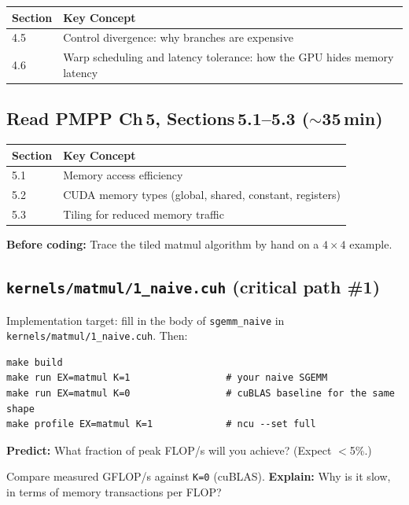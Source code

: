 \documentclass[11pt, letterpaper]{article}
\begin{document}
\begin{tabularx}{\textwidth}{@{}lX@{}}
\toprule
\textbf{Section} & \textbf{Key Concept} \\
\midrule
4.5 & Control divergence: why branches are expensive \\
4.6 & Warp scheduling and latency tolerance: how the GPU hides memory latency \\
\bottomrule
\end{tabularx}

\subsection{Read PMPP Ch\,5, Sections\,5.1--5.3 ($\sim$35\,min)}

\begin{tabularx}{\textwidth}{@{}lX@{}}
\toprule
\textbf{Section} & \textbf{Key Concept} \\
\midrule
5.1 & Memory access efficiency \\
5.2 & CUDA memory types (global, shared, constant, registers) \\
5.3 & Tiling for reduced memory traffic \\
\bottomrule
\end{tabularx}

\textbf{Before coding:} Trace the tiled matmul algorithm by hand on a $4 \times 4$ example.

\subsection{\texttt{kernels/matmul/1\_naive.cuh} (critical path \#1)}

Implementation target: fill in the body of \texttt{sgemm\_naive} in \texttt{kernels/matmul/1\_naive.cuh}. Then:

\begin{verbatim}
make build
make run EX=matmul K=1                 # your naive SGEMM
make run EX=matmul K=0                 # cuBLAS baseline for the same shape
make profile EX=matmul K=1             # ncu --set full
\end{verbatim}

\begin{stepbox}
\textbf{Predict:} What fraction of peak FLOP/s will you achieve? (Expect $<$5\%.)

Compare measured GFLOP/s against \texttt{K=0} (cuBLAS). \textbf{Explain:} Why is it slow, in terms of memory transactions per FLOP?
\end{stepbox}
\end{document}

